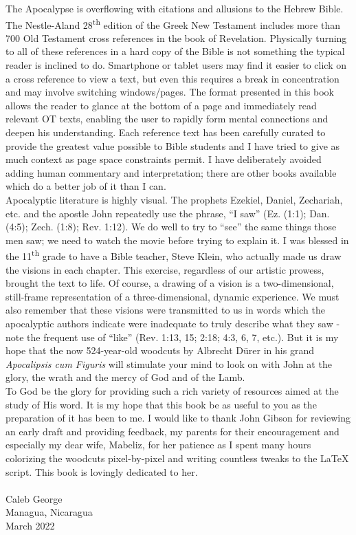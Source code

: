 The Apocalypse is overflowing with citations and allusions to the Hebrew Bible. The Nestle-Aland 28\textsuperscript{th} edition of the Greek New Testament includes more than 700 Old Testament cross references in the book of Revelation. Physically turning to all of these references in a hard copy of the Bible is not something the typical reader is inclined to do. Smartphone or tablet users may find it easier to click on a cross reference to view a text, but even this requires a break in concentration and may involve switching windows/pages. The format presented in this book allows the reader to glance at the bottom of a page and immediately read relevant OT texts, enabling the user to rapidly form mental connections and deepen his understanding. Each reference text has been carefully curated to provide the greatest value possible to Bible students and I have tried to give as much context as page space constraints permit. I have deliberately avoided adding human commentary and interpretation; there are other books available which do a better job of it than I can.\\

Apocalyptic literature is highly visual. The prophets Ezekiel, Daniel, Zechariah, etc. and the apostle John repeatedly use the phrase, ``I saw'' (Ez. (1:1); Dan. (4:5); Zech. (1:8); Rev. 1:12). We do well to try to ``see'' the same things those men saw; we need to watch the movie before trying to explain it. I was blessed in the 11\textsuperscript{th} grade to have a Bible teacher, Steve Klein, who actually made us draw the visions in each chapter. This exercise, regardless of our artistic prowess, brought the text to life. Of course, a drawing of a vision is a two-dimensional, still-frame representation of a three-dimensional, dynamic experience. We must also remember that these visions were transmitted to us in words which the apocalyptic authors indicate were inadequate to truly describe what they saw - note the frequent use of ``like'' (Rev. 1:13, 15; 2:18; 4:3, 6, 7, etc.). But it is my hope that the now 524-year-old woodcuts by Albrecht Dürer in his grand \textit{Apocalipsis cum Figuris} will stimulate your mind to look on with John at the glory, the wrath and the mercy of God and of the Lamb.\\

To God be the glory for providing such a rich variety of resources aimed at the study of His word. It is my hope that this book be as useful to you as the preparation of it has been to me. I would like to thank John Gibson for reviewing an early draft and providing feedback, my parents for their encouragement and especially my dear wife, Mabeliz, for her patience as I spent many hours colorizing the woodcuts pixel-by-pixel and writing countless tweaks to the \LaTeX{} script. This book is lovingly dedicated to her.\\
\\
Caleb George\\
Managua, Nicaragua\\
March 2022
\clearpage

